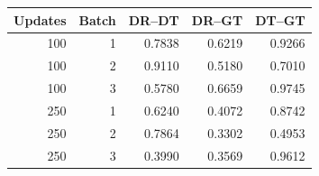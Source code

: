 \begin{tabular}{rrrrr}
\toprule
Updates & Batch & DR--DT & DR--GT & DT--GT \\
\midrule
100 & 1 & 0.7838 & 0.6219 & 0.9266 \\
100 & 2 & 0.9110 & 0.5180 & 0.7010 \\
100 & 3 & 0.5780 & 0.6659 & 0.9745 \\
250 & 1 & 0.6240 & 0.4072 & 0.8742 \\
250 & 2 & 0.7864 & 0.3302 & 0.4953 \\
250 & 3 & 0.3990 & 0.3569 & 0.9612 \\
\bottomrule
\end{tabular}
